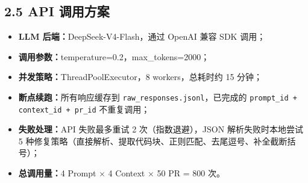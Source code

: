 \documentclass{experimentreport}
\begin{document}
{\subsection*{2.5 API 调用方案}

\begin{itemize}
    \item \textbf{LLM 后端：}DeepSeek-V4-Flash，通过 OpenAI 兼容 SDK 调用；
    \item \textbf{调用参数：}temperature=0.2，max\_tokens=2000；
    \item \textbf{并发策略：}ThreadPoolExecutor，8 workers，总耗时约 15 分钟；
    \item \textbf{断点续跑：}所有响应缓存到 \texttt{raw\_responses.jsonl}，已完成的 \texttt{prompt\_id + context\_id + pr\_id} 不重复调用；
    \item \textbf{失败处理：}API 失败最多重试 2 次（指数退避），JSON 解析失败时本地尝试 5 种修复策略（直接解析、提取代码块、正则匹配、去尾逗号、补全截断括号）；
    \item \textbf{总调用量：}4 Prompt $\times$ 4 Context $\times$ 50 PR = 800 次。
\end{itemize}

}

\end{document}
